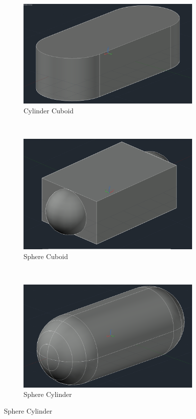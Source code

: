 \begin{figure}
	\begin{subfigure}[t]{0.32\textwidth} 
		\centering
		\includegraphics[width=\linewidth]{Ressourcen/IMG/CubCyl}
		\caption{Cylinder Cuboid}
		\label{fig:sim:cubcyl}
	\end{subfigure}
	~
	\begin{subfigure}[t]{0.32\textwidth} 
		\centering
		\includegraphics[width=\linewidth]{Ressourcen/IMG/CubSph}
		\caption{Sphere Cuboid}
		\label{fig:sim:cubsph}
	\end{subfigure}
	~
	\begin{subfigure}[t]{0.32\textwidth} 
		\centering
		\includegraphics[width=\linewidth]{Ressourcen/IMG/CylSph}
		\caption{Sphere Cylinder}
		\label{fig:sim:cylsph}
	\end{subfigure}
	

\end{figure}
